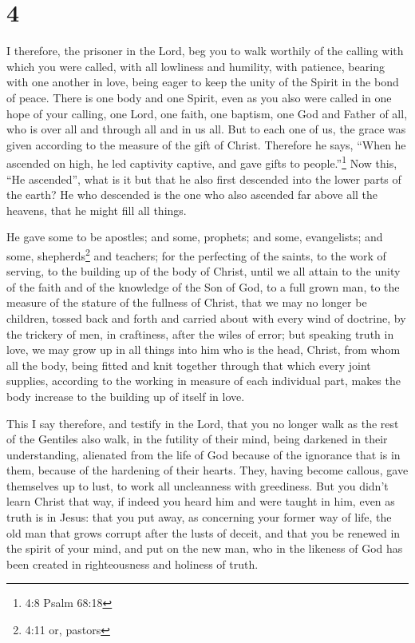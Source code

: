 \hypertarget{section-3}{%
\section{4}\label{section-3}}

 I therefore, the prisoner in the Lord, beg you to walk
worthily of the calling with which you were called,  with
all lowliness and humility, with patience, bearing with one another in
love,  being eager to keep the unity of the Spirit in the
bond of peace.  There is one body and one Spirit, even as
you also were called in one hope of your calling,  one Lord,
one faith, one baptism,  one God and Father of all, who is
over all and through all and in us all.  But to each one of
us, the grace was given according to the measure of the gift of Christ.
 Therefore he says, ``When he ascended on high, he led
captivity captive, and gave gifts to people.''\footnote{4:8 Psalm 68:18}
 Now this, ``He ascended'', what is it but that he also
first descended into the lower parts of the earth?  He who
descended is the one who also ascended far above all the heavens, that
he might fill all things.

 He gave some to be apostles; and some, prophets; and some,
evangelists; and some, shepherds\footnote{4:11 or, pastors} and
teachers;  for the perfecting of the saints, to the work of
serving, to the building up of the body of Christ,  until
we all attain to the unity of the faith and of the knowledge of the Son
of God, to a full grown man, to the measure of the stature of the
fullness of Christ,  that we may no longer be children,
tossed back and forth and carried about with every wind of doctrine, by
the trickery of men, in craftiness, after the wiles of error;
 but speaking truth in love, we may grow up in all things
into him who is the head, Christ,  from whom all the body,
being fitted and knit together through that which every joint supplies,
according to the working in measure of each individual part, makes the
body increase to the building up of itself in love.

 This I say therefore, and testify in the Lord, that you no
longer walk as the rest of the Gentiles also walk, in the futility of
their mind,  being darkened in their understanding,
alienated from the life of God because of the ignorance that is in them,
because of the hardening of their hearts.  They, having
become callous, gave themselves up to lust, to work all uncleanness with
greediness.  But you didn't learn Christ that way,
 if indeed you heard him and were taught in him, even as
truth is in Jesus:  that you put away, as concerning your
former way of life, the old man that grows corrupt after the lusts of
deceit,  and that you be renewed in the spirit of your
mind,  and put on the new man, who in the likeness of God
has been created in righteousness and holiness of truth.

